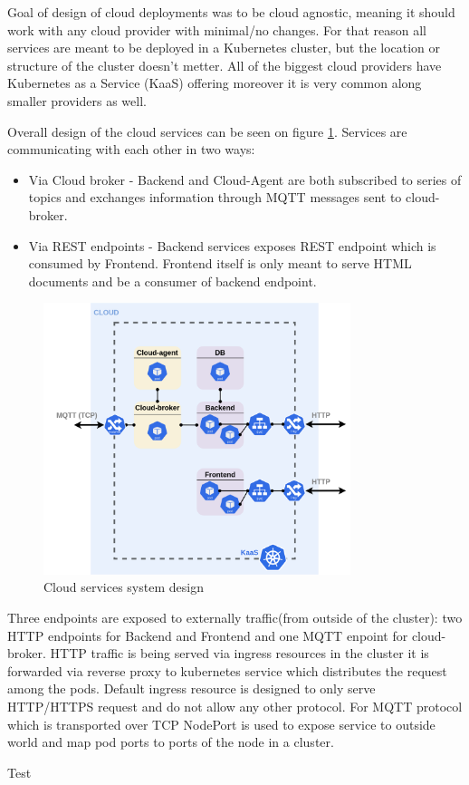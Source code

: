 Goal of design of cloud deployments was to be cloud agnostic, meaning it should work with any cloud provider with minimal/no changes. For that reason all services are meant to be deployed in a Kubernetes cluster, but the location or structure of the cluster doesn't metter. All of the biggest cloud providers have Kubernetes as a Service (KaaS) offering moreover it is very common along smaller providers as well.

Overall design of the cloud services can be seen on figure \ref{fig:cloud_services}. Services are communicating with each other in two ways:
\begin{itemize}
    \item Via Cloud broker - Backend and Cloud-Agent are both subscribed to series of topics and exchanges information through MQTT messages sent to cloud-broker. 
    \item Via REST endpoints - Backend services exposes REST endpoint which is consumed by Frontend. Frontend itself is only meant to serve HTML documents and be a consumer of backend endpoint.
\end{itemize}

\begin{figure}[H]
    \centering
    \includegraphics[width=0.8\textwidth]{pictures/cloud_services.png}
    \caption{ Cloud services system design }
    \label{fig:cloud_services}
\end{figure}

Three endpoints are exposed to externally traffic(from outside of the cluster): two HTTP endpoints for Backend and Frontend and one MQTT enpoint for cloud-broker.
HTTP traffic is being served via ingress resources in the cluster it is forwarded via reverse proxy to kubernetes service which distributes the request among the pods. Default ingress resource is designed to only serve HTTP/HTTPS request and do not allow any other protocol. For MQTT protocol which is transported over TCP NodePort is used to expose service to outside world and map pod ports to ports of the node in a cluster.

Test